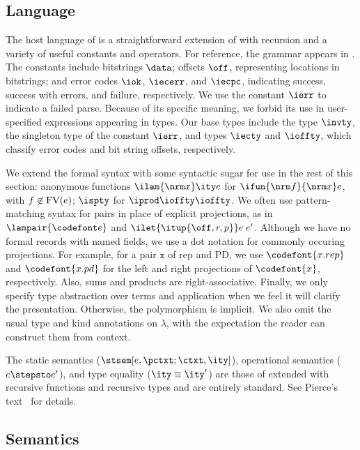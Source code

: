 \subsection{\Implang{} Language}
\label{sec:host-lang}
The host language of \ddc{} is a straightforward 
extension of \fomega{} with recursion and a variety of useful constants
and operators.  
For reference, the grammar appears in .
The constants include bitstrings $\data$; offsets $\off$, representing
locations in bitstrings; and error codes $\iok$, $\iecerr$, and
$\iecpc$, indicating success, success with errors, and failure,
respectively. We use the constant $\ierr$ to indicate a failed parse.
Because of its specific meaning, we forbid its use in user-specified
expressions appearing in \ddc{} types.
Our base types include the type $\invty$, the singleton type of the
constant $\ierr$, and types $\iecty$ and $\ioffty$, which classify
error codes and bit string offsets, respectively.

We extend the formal syntax with some syntactic sugar for use in the
rest of this section: anonymous functions $\ilam {\nrm x} \ity e$ for
$\ifun {\nrm f} {\nrm x} e$, with $f \not\in {\rm FV}(e)$; $\ispty$
for $\iprod \ioffty \ioffty$.  We often use pattern-matching syntax
for pairs in place of explicit projections, as in $\lampair{\codefont
  e}$ and $\ilet {\itup{\off,r,p}} e\; e'$.  Although we have no
formal records with named fields, we use a dot notation for commonly
occuring projections. For example, for a pair $\mathtt x$ of rep and
PD, we use $\codefont{x.rep}$ and $\codefont{x.pd}$ for the left and
right projections of $\codefont{x}$, respectively. Also, sums and
products are right-associative.  Finally, we only specify type
abstraction over terms and application when we feel it will clarify
the presentation. Otherwise, the polymorphism is implicit.  We also
omit the usual type and kind annotations on $\lambda$, with the
expectation the reader can construct them from context.  

The static semantics ($\stsem[e,{\pctxt;\ctxt},\ity]$), operational
semantics ($e \stepsto e'$), and type 
equality ($\ity \equiv \ity'$) are those of \fomega{} extended with
recursive functions and recursive types and are entirely standard.
See Pierce's text~\cite{pierce:tapl} for details.

\subsection{\ddc{} Semantics}
\label{sec:ddc-sem}

